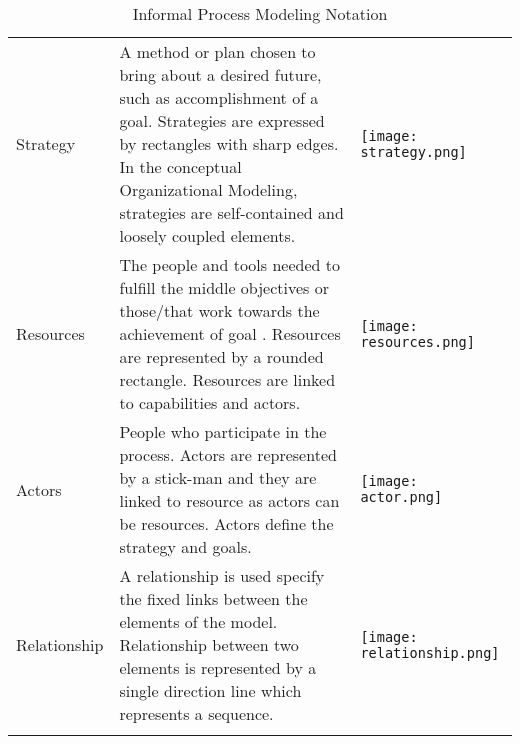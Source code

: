 \begin{center}
\begin{longtable}{p{3cm}p{10cm}p{3cm}}
		
		Strategy		&  A method or plan chosen to bring about a desired future, such as accomplishment of a goal. Strategies are expressed by rectangles with sharp edges. In the conceptual Organizational Modeling, strategies are self-contained and loosely coupled elements.   & \begin{center} \texttt{[image: strategy.png]} \end{center}   \\
		
		Resources					& The people and tools needed to fulfill the middle objectives or those/that work towards the achievement of goal . Resources are represented by a rounded rectangle. Resources are linked to capabilities and actors. & \begin{center} \texttt{[image: resources.png]} \end{center}   \\
		
		Actors					& People who participate in the process. Actors are represented by a stick-man and they are linked to resource as actors can be resources. Actors define the strategy and goals.  & \begin{center} \texttt{[image: actor.png]} \end{center}   \\
		
		Relationship				& A relationship is used specify the fixed links between the elements of the model. Relationship between two elements is represented by a single direction line which represents a sequence.  & \begin{center} \texttt{[image: relationship.png]} \end{center}   \\
		
		
		\bottomrule
		\caption{Informal Process Modeling Notation}
		\label{tab:notations}		
	\end{longtable}	
\end{center}


